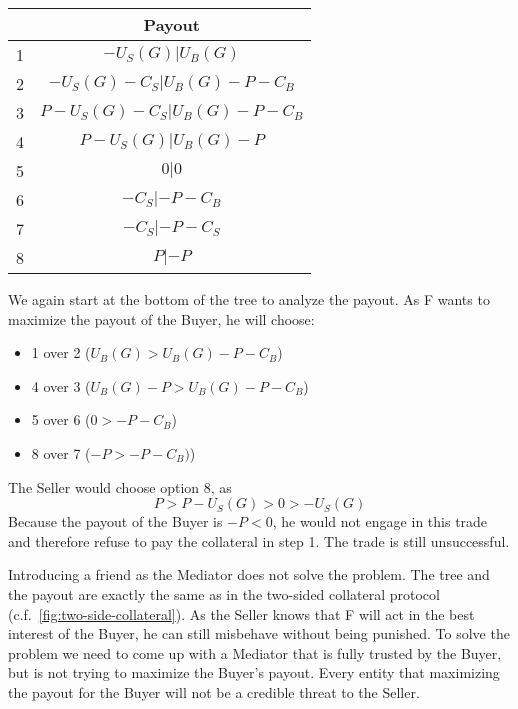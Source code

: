 \documentclass{cacthesis}
\begin{document}
\begin{center}
\begin{tabular}{ |c|c| }
\hline
& Payout  \\
\hline
\hline
1& $-U_S(G) | U_B(G)$\\
\hline
2& $-U_S(G) - C_S| U_B(G)- P - C_B $\\
\hline
3&$P-U_S(G) - C_S | U_B(G) -P - C_B$ \\
\hline
4& $P-U_S(G)| U_B(G)-P$\\
\hline
5& $0|0$\\
\hline 
6& $-C_S |-P - C_B$\\
\hline
7& $- C_S| -P-C_S$\\
\hline
8& $P| -P$\\
\hline
\end{tabular}
\end{center}
We again start at the bottom of the tree to analyze the payout. As F wants to maximize the payout of the Buyer, he will choose:
\begin{itemize}
    \item 1 over 2 ($U_B(G) > U_B(G) -P -C_B$)
    \item 4 over 3 ($U_B(G) - P > U_B(G) -P -C_B$)
    \item 5 over 6 ($0 > -P -C_B$)
    \item 8 over 7 ($-P > -P -C_B)$)
\end{itemize}
The Seller would choose option 8, as 
\[P>P-U_S(G)>0>-U_S(G)\]
Because the payout of the Buyer is $-P<0$, he would not engage in this trade and therefore refuse to pay the collateral in step 1. The trade is still unsuccessful.\newline

Introducing a friend as the Mediator does not solve the problem. The tree and
the payout are exactly the same as in the two-sided collateral protocol (c.f.~\ref{fig:two-side-collateral}). As the Seller knows that F will act in the best interest of the Buyer, he can still misbehave without being punished.
To solve the problem we need to come up with a Mediator that is fully trusted by
the Buyer, but is not trying to maximize the Buyer's payout.
Every entity that maximizing the payout for the Buyer will not be a
credible threat to the Seller.
\end{document}
